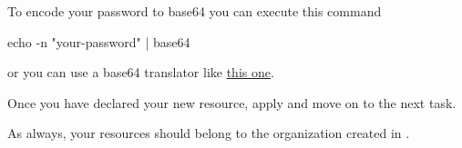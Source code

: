 \begin{tip}
    To encode your password to base64 you can execute this command 
    \begin{shell}
echo -n "your-password" | base64
    \end{shell}
    or you can use a base64 translator like \href{https://www.base64encode.org/}{this one}.
\end{tip}


Once you have declared your new resource, apply and move on to the next task.

\begin{warn}
As always, your resources should belong to the organization created in
.
\end{warn}


